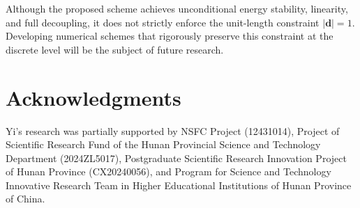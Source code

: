 \documentclass[12pt,reqno]{amsart}
\numberwithin{equation}{section}
\begin{document}
Although the proposed scheme achieves unconditional energy stability, linearity, and full decoupling, it does not strictly enforce the unit-length constraint $|\mathbf{d}| = 1$. 
Developing numerical schemes that rigorously preserve this constraint at the discrete level will be the subject of future research.

\section*{Acknowledgments}
Yi's research was partially supported by NSFC Project (12431014), 
Project of Scientific Research Fund of the Hunan Provincial Science and Technology Department (2024ZL5017), Postgraduate Scientific Research Innovation Project of Hunan Province (CX20240056), and Program for Science and Technology Innovative Research Team in Higher Educational Institutions of Hunan Province of China.
\end{document}
